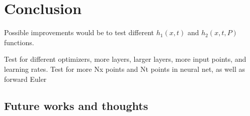 \section{Conclusion}


Possible improvements would be to test different $h_1(x,t)$ and $h_2(x,t,P)$ functions.

Test for different optimizers, more layers, larger layers, more input points, and learning rates.
Test for more Nx points and Nt points in neural net, as well as forward Euler

\subsection{Future works and thoughts}